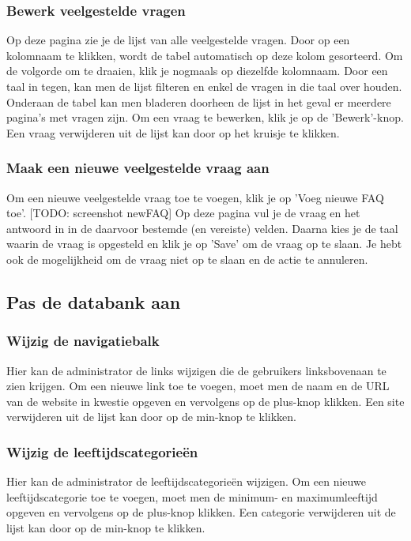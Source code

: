 \documentclass[]{article}
\begin{document}
\subsubsection{Bewerk veelgestelde vragen}
Op deze pagina zie je de lijst van alle veelgestelde vragen. Door op een kolomnaam te klikken, wordt de tabel automatisch op deze kolom gesorteerd. Om de volgorde om te draaien, klik je nogmaals op diezelfde kolomnaam. Door een taal in tegen, kan men de lijst filteren en enkel de vragen in die taal over houden. Onderaan de tabel kan men bladeren doorheen de lijst in het geval er meerdere pagina's met vragen zijn. Om een vraag te bewerken, klik je op de 'Bewerk'-knop. Een vraag verwijderen uit de lijst kan door op het kruisje te klikken.

\subsubsection{Maak een nieuwe veelgestelde vraag aan}
Om een nieuwe veelgestelde vraag toe te voegen, klik je op 'Voeg nieuwe FAQ toe'. [TODO: screenshot newFAQ] Op deze pagina vul je de vraag en het antwoord in in de daarvoor bestemde (en vereiste) velden. Daarna kies je de taal waarin de vraag is opgesteld en klik je op 'Save' om de vraag op te slaan. Je hebt ook de mogelijkheid om de vraag niet op te slaan en de actie te annuleren.

\subsection{Pas de databank aan}

\subsubsection{Wijzig de navigatiebalk}
Hier kan de administrator de links wijzigen die de gebruikers linksbovenaan te zien krijgen. Om een nieuwe link toe te voegen, moet men de naam en de URL van de website in kwestie opgeven en vervolgens op de plus-knop klikken. Een site verwijderen uit de lijst kan door op de min-knop te klikken.

\subsubsection{Wijzig de leeftijdscategorieën}
Hier kan de administrator de leeftijdscategorieën wijzigen. Om een nieuwe leeftijdscategorie toe te voegen, moet men de minimum- en maximumleeftijd opgeven en vervolgens op de plus-knop klikken. Een categorie verwijderen uit de lijst kan door op de min-knop te klikken.
\end{document}
